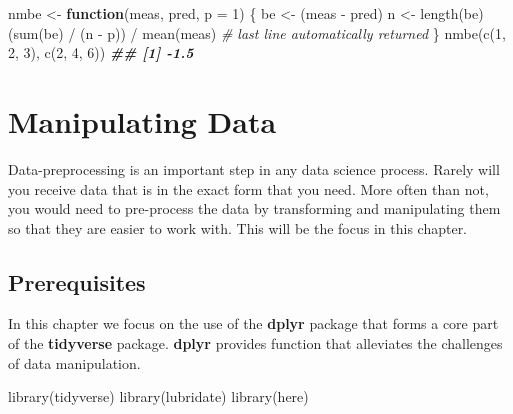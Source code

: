 \documentclass[
]{book}
\newenvironment{Shaded}{\begin{snugshade}}{\end{snugshade}}
\newcommand{\AttributeTok}[1]{\textcolor[rgb]{0.77,0.63,0.00}{#1}}
\newcommand{\CommentTok}[1]{\textcolor[rgb]{0.56,0.35,0.01}{\textit{#1}}}
\newcommand{\ControlFlowTok}[1]{\textcolor[rgb]{0.13,0.29,0.53}{\textbf{#1}}}
\newcommand{\DecValTok}[1]{\textcolor[rgb]{0.00,0.00,0.81}{#1}}
\newcommand{\DocumentationTok}[1]{\textcolor[rgb]{0.56,0.35,0.01}{\textbf{\textit{#1}}}}
\newcommand{\FunctionTok}[1]{\textcolor[rgb]{0.00,0.00,0.00}{#1}}
\newcommand{\NormalTok}[1]{#1}
\newcommand{\OtherTok}[1]{\textcolor[rgb]{0.56,0.35,0.01}{#1}}
\newcommand{\SpecialCharTok}[1]{\textcolor[rgb]{0.00,0.00,0.00}{#1}}
\begin{document}
\begin{Shaded}
\begin{Highlighting}[]
\NormalTok{nmbe }\OtherTok{\textless{}{-}} \ControlFlowTok{function}\NormalTok{(meas, pred, }\AttributeTok{p =} \DecValTok{1}\NormalTok{) \{}
\NormalTok{  be }\OtherTok{\textless{}{-}}\NormalTok{ (meas }\SpecialCharTok{{-}}\NormalTok{ pred)}
\NormalTok{  n }\OtherTok{\textless{}{-}} \FunctionTok{length}\NormalTok{(be)}
\NormalTok{  (}\FunctionTok{sum}\NormalTok{(be) }\SpecialCharTok{/}\NormalTok{ (n }\SpecialCharTok{{-}}\NormalTok{ p)) }\SpecialCharTok{/} \FunctionTok{mean}\NormalTok{(meas) }\CommentTok{\# last line automatically returned}
\NormalTok{\}}
\FunctionTok{nmbe}\NormalTok{(}\FunctionTok{c}\NormalTok{(}\DecValTok{1}\NormalTok{, }\DecValTok{2}\NormalTok{, }\DecValTok{3}\NormalTok{), }\FunctionTok{c}\NormalTok{(}\DecValTok{2}\NormalTok{, }\DecValTok{4}\NormalTok{, }\DecValTok{6}\NormalTok{))}
\DocumentationTok{\#\# [1] {-}1.5}
\end{Highlighting}
\end{Shaded}

\hypertarget{manipulate}{%
\chapter{Manipulating Data}\label{manipulate}}

Data-preprocessing is an important step in any data science process. Rarely will you receive data that is in the exact form that you need. More often than not, you would need to pre-process the data by transforming and manipulating them so that they are easier to work with. This will be the focus in this chapter.

\hypertarget{prerequisites-6}{%
\section{Prerequisites}\label{prerequisites-6}}

In this chapter we focus on the use of the \textbf{dplyr} package that forms a core part of the \textbf{tidyverse} package. \textbf{dplyr} provides function that alleviates the challenges of data manipulation.

\begin{Shaded}
\begin{Highlighting}[]
\FunctionTok{library}\NormalTok{(tidyverse)}
\FunctionTok{library}\NormalTok{(lubridate)}
\FunctionTok{library}\NormalTok{(here)}
\end{Highlighting}
\end{Shaded}
\end{document}
